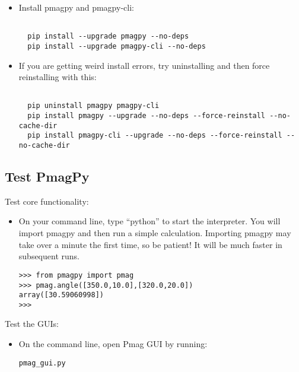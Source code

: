 \documentclass[11pt]{article}
\begin{document}
\begin{itemize}
\item Install pmagpy and pmagpy-cli:

\begin{verbatim}

  pip install --upgrade pmagpy --no-deps
  pip install --upgrade pmagpy-cli --no-deps
\end{verbatim}
     \item If you are getting weird install errors, try uninstalling and then force reinstalling with this:

\begin{verbatim}

  pip uninstall pmagpy pmagpy-cli
  pip install pmagpy --upgrade --no-deps --force-reinstall --no-cache-dir
  pip install pmagpy-cli --upgrade --no-deps --force-reinstall --no-cache-dir
\end{verbatim}

   \end{itemize}


\subsection{Test PmagPy}

Test core functionality:

\begin{itemize}
  \item On your command line, type ``python'' to start the interpreter.  You will import pmagpy and then run a simple calculation.  Importing pmagpy may take over a minute the first time, so be patient!  It will be much faster in subsequent runs.

\begin{verbatim}
>>> from pmagpy import pmag
>>> pmag.angle([350.0,10.0],[320.0,20.0])
array([30.59060998])
>>>
\end{verbatim}

\end{itemize}

Test the GUIs:

\begin{itemize}
\item  On the command line, open Pmag GUI by running:

\begin{verbatim}
pmag_gui.py
\end{verbatim}

\end{itemize}
\end{document}
